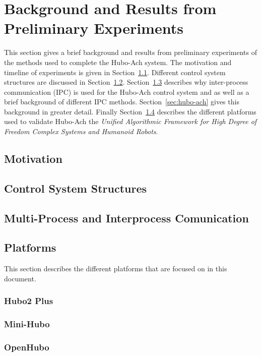 \chapter{Background and Results from Preliminary Experiments}\label{sec:background}

This section gives a brief background and results from preliminary experiments of the methods used to complete the Hubo-Ach system.
The motivation and timeline of experiments is given in Section~\ref{sec:roadmap}.
Different control system structures are discussed in Section~\ref{sec:back:struct}.
Section~\ref{sec:back:hubo-ach} describes why inter-process communication (IPC) is used for the Hubo-Ach control system and as well as a brief background of different IPC methods.
Section~\ref{sec:hubo-ach} gives this background in greater detail.
Finally Section~\ref{sec:robots} describes the different platforms used to validate Hubo-Ach the \textit{Unified Algorithmic Framework for High Degree of Freedom Complex Systems and Humanoid Robots}.


	\section{Motivation}\label{sec:roadmap}	
		
		

	\section{Control System Structures}\label{sec:back:struct}
			
	\section{Multi-Process and Interprocess Comunication}\label{sec:back:hubo-ach}
	    
	    		
	    		
	\section{Platforms}\label{sec:robots}
	This section describes the different platforms that are focused on in this document.
		\subsection{Hubo2 Plus}\label{sec:hubo}
			
		\subsection{Mini-Hubo}\label{sec:mini-hubo}
			
		\subsection{OpenHubo}\label{sec:openhubo}
			
		
